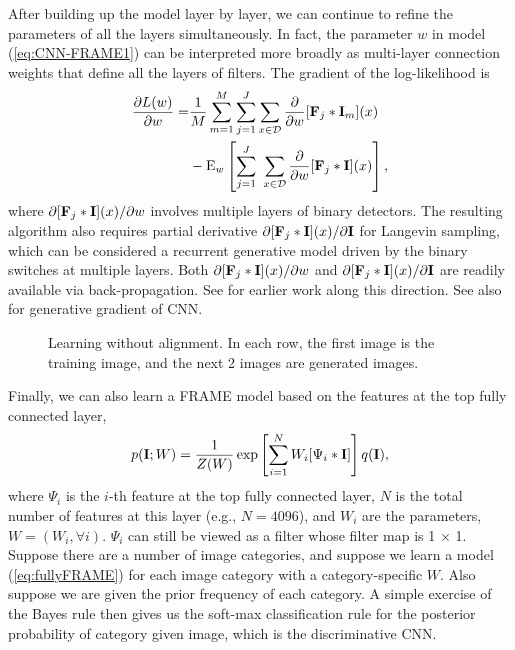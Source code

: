\documentclass[letterpaper]{article}
\def\E{{\rm E}}
\def\I{{\bf I}}
\def\F{{\bf F}}
\begin{document}
After building up the model layer by layer, we can continue to refine the parameters of all the layers simultaneously. In fact, the parameter $w$ in model (\ref{eq:CNN-FRAME1}) can be interpreted more broadly as multi-layer connection weights that define all the layers of filters. The gradient of the log-likelihood is 
\begin{equation}
\begin{aligned}
\frac{\partial L(w)}{\partial w} =& \frac{1}{M} \sum_{m=1}^{M}  \sum_{j=1}^{J} \sum_{x \in {\cal D}} \frac{\partial}{\partial w} [\F_j*\I_m](x) \\
      &   -  \E_{w} \left[  \sum_{j=1}^{J} \ \sum_{x \in {\cal D}} \frac{\partial}{\partial w} [\F_j*\I](x)\right], 
\end{aligned}
\label{eq:generativeGradient1}
\end{equation}
where $\partial [\F_j*\I](x)/\partial w$ involves multiple layers of binary detectors. The resulting algorithm also requires partial derivative $\partial [\F_j *\I](x)/\partial \I$ for Langevin sampling, which can be considered a recurrent generative model driven by the binary switches at multiple layers.  Both $\partial [\F_j *\I](x)/\partial w$ and $\partial [\F_j *\I](x)/\partial \I$  are readily available via back-propagation. See \cite{hinton2006unsupervised, Ng2011} for earlier work along this direction.  See also   \cite{Dai2015ICLR} for generative gradient of CNN. 


\begin{figure}
	\centering
	\setlength{\fboxrule}{1pt}
	\setlength{\fboxsep}{0cm}
		\caption{Learning without alignment.  
		In each row, the first  image is the training image, and the next  2  images are generated images. }
	\label{fig:nonalign1}
\end{figure}


Finally, we can also learn a FRAME model based on the features at the top fully connected layer, 
\begin{eqnarray}
   p(\I; W) =  \frac{1}{Z(W)}  \exp \left[  \sum_{i=1}^{N} W_i [\Psi_i*\I] \right]q(\I), 
   \label{eq:fullyFRAME}
\end{eqnarray}
where $\Psi_i$ is the $i$-th feature at the top fully connected layer,  $N$ is the total number of features at this layer (e.g., $N = 4096$), and $W_i$ are the parameters, $W = (W_i, \forall i)$.  $\Psi_i$ can still be viewed as a filter whose filter map is 1 $\times$ 1. Suppose there are a number of image categories, and suppose we learn a model (\ref{eq:fullyFRAME}) for each image category with a category-specific $W$. Also suppose we are given the prior frequency of each category. A simple exercise of the Bayes rule then gives us the soft-max classification rule for the posterior probability of category given image, which is   the discriminative CNN. 
\end{document}
